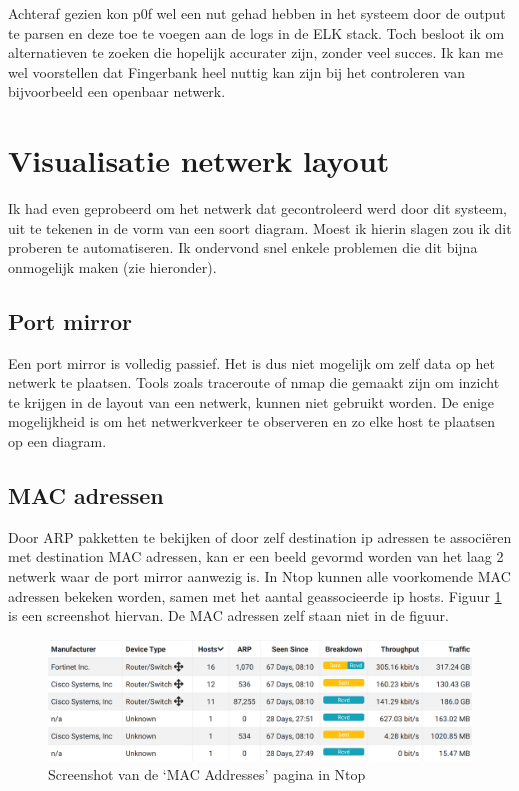 \documentclass[a4paper, 12pt]{report}
\begin{document}
Achteraf gezien kon p0f wel een nut gehad hebben in het systeem door de output te parsen en deze toe te voegen aan de logs in de ELK stack.
Toch besloot ik om alternatieven te zoeken die hopelijk accurater zijn, zonder veel succes.
Ik kan me wel voorstellen dat Fingerbank heel nuttig kan zijn bij het controleren van bijvoorbeeld een openbaar netwerk.

\section{Visualisatie netwerk layout}
Ik had even geprobeerd om het netwerk dat gecontroleerd werd door dit systeem, uit te tekenen in de vorm van een soort diagram.
Moest ik hierin slagen zou ik dit proberen te automatiseren.
Ik ondervond snel enkele problemen die dit bijna onmogelijk maken (zie hieronder).

\subsection{Port mirror}
Een port mirror is volledig passief.
Het is dus niet mogelijk om zelf data op het netwerk te plaatsen.
Tools zoals traceroute of nmap die gemaakt zijn om inzicht te krijgen in de layout van een netwerk, kunnen niet gebruikt worden.
De enige mogelijkheid is om het netwerkverkeer te observeren en zo elke host te plaatsen op een diagram.

\subsection{MAC adressen}
Door ARP pakketten te bekijken of door zelf destination ip adressen te associëren met destination MAC adressen, kan er een beeld gevormd worden van het laag 2 netwerk waar de port mirror aanwezig is.
In Ntop kunnen alle voorkomende MAC adressen bekeken worden, samen met het aantal geassocieerde ip hosts.
Figuur \ref{fig:visualisatie-netwerk-layout-ntop-mac} is een screenshot hiervan.
De MAC adressen zelf staan niet in de figuur.

\begin{figure}[H]
  \centering
  \includegraphics[width=\textwidth]{visualisatie-netwerk-layout-ntop-mac}
  \caption{Screenshot van de `MAC Addresses' pagina in Ntop}
  \label{fig:visualisatie-netwerk-layout-ntop-mac}
\end{figure}
\end{document}
